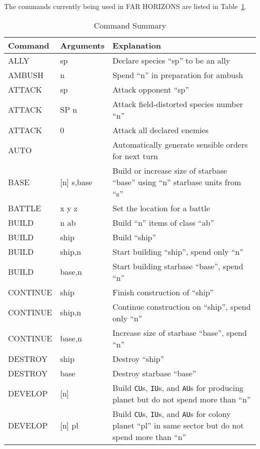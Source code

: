 \documentclass[10pt,titlepage]{article}
\begin{document}
The commands currently being used in FAR HORIZONS are listed in Table~\ref{tab:commands}.
 
\begin{longtable}{|llp{9cm}|}
\caption{Command Summary} \label{tab:commands} \\
\hline
\rowcolor{lightblue} \textbf{Command} &    \textbf{Arguments} & \textbf{Explanation} \\
\hline
ALLY           & sp          &    Declare species ``sp'' to be an ally \\
AMBUSH       &   n           &    Spend ``n'' in preparation for ambush \\
ATTACK       &   sp          &    Attack opponent ``sp'' \\
ATTACK       &   SP n        &    Attack field-distorted species number ``n'' \\
ATTACK       &   0           &    Attack all declared enemies \\
AUTO         &               &    Automatically generate sensible orders for  next turn \\
BASE        &    [n] s,base &     Build or increase size of starbase ``base'' using ``n'' starbase units from ``s''  \\
BATTLE      &    x y z     &      Set the location for a battle  \\
BUILD       &    n ab      &      Build ``n'' items of class ``ab''  \\
BUILD       &    ship      &      Build ``ship''  \\
BUILD       &    ship,n    &      Start building ``ship'', spend only ``n'' \\
BUILD       &    base,n    &      Start building starbase ``base'', spend ``n''  \\
CONTINUE    &    ship      &      Finish construction of ``ship''  \\
CONTINUE    &    ship,n    &      Continue construction on ``ship'', spend only ``n''  \\
CONTINUE    &    base,n    &      Increase size of starbase ``base'', spend ``n''  \\
DESTROY     &    ship      &      Destroy ``ship''  \\
DESTROY     &    base      &      Destroy starbase ``base''  \\
DEVELOP     &    [n]       &      Build \texttt{CU}s, \texttt{IU}s, and \texttt{AU}s for producing planet but do not spend more than ``n'' \\
DEVELOP    &     [n] pl   &       Build \texttt{CU}s, \texttt{IU}s, and \texttt{AU}s for colony planet ``pl'' in same sector but do not spend more than ``n''  \\

\end{longtable}
\end{document}
